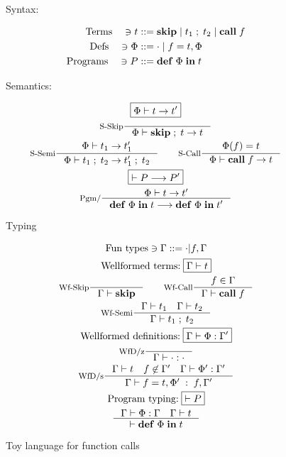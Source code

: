 \documentclass[a4paper, oneside, 10pt, draft]{memoir}
\begin{document}
\newcommand{\fskip}{\mathbf{skip}}
\newcommand{\fsemi}[2]{#1 \; ; \; #2}
\newcommand{\fcall}[1]{\mathbf{call} \; #1}
\newcommand{\fpgm}[2]{\mathbf{def} \; #1 \; \mathbf{in} \; #2}
\begin{figure}
  \begin{center}
    Syntax:
  \end{center}
  \begin{align*}
    \text{Terms} \quad \ni t & ::= \fskip{} \bor \fsemi{t_1}{t_2} \bor
    \fcall{f}\\
    \text{Defs} \quad \ni \Phi & ::= \cdot \bor f = t, \Phi\\
    \text{Programs} \quad \ni P & ::= \fpgm{\Phi}{t}
  \end{align*}
  \begin{center}
    Semantics:
  \end{center}
  \begin{gather*}
    \boxed{\Phi |- t -> t'}\\
    \inference[S-Skip]{}{\Phi |- \fsemi{\fskip{}}{t} -> t}\\
    \inference[S-Semi]{\Phi |- t_1 -> t'_1}{\Phi |- \fsemi{t_1}{t_2}
      -> \fsemi{t'_1}{t_2}} \quad \quad
    \inference[S-Call]{\Phi(f) = t}{\Phi |- \fcall{f} -> t}\\
    \boxed{|- P --> P'}\\
    \inference[Pgm/]{\Phi |- t -> t'}{\fpgm{\Phi}{t} --> \fpgm{\Phi}{t'}}
  \end{gather*}
  \begin{center}
    Typing
  \end{center}
  \begin{gather*}
    \text{Fun types} \ni \Gamma ::= \cdot | f,\Gamma\\
    \text{Wellformed terms:} \; \boxed{\Gamma |- t}\\
    \inference[Wf-Skip]{}{\Gamma |- \fskip{}} \quad \quad
    \inference[Wf-Call]{f \in \Gamma}{\Gamma |- \fcall{f}}\\
    \inference[Wf-Semi]{\Gamma |- t_1 \quad \Gamma |- t_2}{\Gamma |-
      \fsemi{t_1}{t_2}}\\
    \text{Wellformed definitions:} \; \boxed{\Gamma |- \Phi :
      \Gamma'}\\
    \inference[WfD/z]{}{\Gamma |- \cdot : \cdot}\\
    \inference[WfD/s]{\Gamma |- t \quad f \not \in \Gamma' \quad
      \Gamma |- \Phi' : \Gamma'}{\Gamma |- f = t, \Phi' \; : \;
      f,\Gamma'}\\
    \text{Program typing:} \; \boxed{|- P}\\
    \inference{\Gamma |- \Phi : \Gamma \quad \Gamma |- t}{|- \fpgm{\Phi}{t}}
  \end{gather*}
  \caption{Toy language for function calls}
  \label{fig:func-call-lang}
\end{figure}
\end{document}
